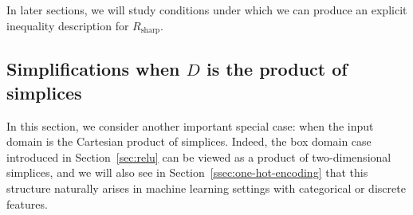 \documentclass[smallextended]{svjour3}
\newcommand{\TODO}[1]{\textbf{\color{red} TODO: }{\emph{#1}}}
\newcommand{\Rsharp}{R_{\operatorname{sharp}}}
\newcommand{\Sideal}{S_{\operatorname{ideal}}}
\newcommand{\Ssharp}{S_{\operatorname{sharp}}}
\newcommand{\magenta}[1]{{\leavevmode\color{Magenta}#1}}
\begin{document}
In later sections, we will study conditions under which we can produce an explicit inequality description for $\Rsharp$.

    



\subsection{Simplifications when $D$ is the product of simplices} \label{sec:product-of-simplices}

In this section, we consider another important special case: when the input domain is the Cartesian product of simplices. Indeed, the box domain case introduced in Section~\ref{sec:relu} can be viewed as a product of two-dimensional simplices, and we will also see in Section~\ref{ssec:one-hot-encoding} that this structure naturally arises in machine learning settings with categorical or discrete features.
\end{document}
